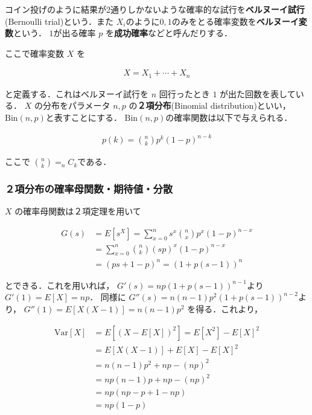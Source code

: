 \documentclass[12pt,a4j,draft]{jarticle}
\numberwithin{equation}{section}
\theoremstyle{break}
\newcommand{\V}{\text{Var}}
\newcommand{\Bin}{\text{Bin}}
\begin{document}
コイン投げのように結果が2通りしかないような確率的な試行を\textbf{ベルヌーイ試行}(Bernoulli trial)という．また $X_i$のように$0,1$のみをとる確率変数を\textbf{ベルヌーイ変数}という． $1$が出る確率 $p$ を\textbf{成功確率}などと呼んだりする．

ここで確率変数 $X$ を

\begin{align}
    X = X_1 + \cdots + X_n
\end{align}

と定義する．これはベルヌーイ試行を $n$ 回行ったとき $1$ が出た回数を表している． $X$ の分布をパラメータ $n,p$ の\textbf{２項分布}(Binomial distribution)といい， $\Bin(n,p)$と表すことにする． $\Bin(n,p)$の確率関数は以下で与えられる．

\begin{align}
    \label{eq:def-pdf-of-bin}
    p(k) = \binom{n}{k} p^k (1-p)^{n-k}
\end{align}

ここで $\displaystyle \binom{n}{k} = _nC_k$である． 

\subsubsection{２項分布の確率母関数・期待値・分散}

$X$ の確率母関数は２項定理を用いて

\begin{align}
    \label{eq:pgf-of-bin}
    G(s) &= E[s^X] = \sum_{x=0}^{n} s^x \binom{n}{x} p^x (1-p)^{n-x} \\
    &= \sum_{x=0}^{n} \binom{n}{k} (sp)^x (1-p)^{n-x} \\
    &= (ps + 1 - p)^n = (1 + p(s-1))^n
\end{align}

とできる．これを用いれば， $G'(s) = np(1 + p(s-1))^{n-1}$より $G'(1) = E[X] = np$． 同様に $G''(s) = n(n-1)p^2(1 + p(s-1))^{n-2}$より， $G''(1) = E[X(X-1)] = n(n-1)p^2$ を得る．これより，

\begin{align}
    \V [X] &= E[(X - E[X])^2] = E[X^2] - E[X]^2 \\
    &= E[X(X-1)] + E[X] - E[X]^2 \\
    &= n(n-1)p^2 + np - (np)^2 \\
    &= np(n-1)p + np - (np)^2 \\
    &= np(np - p + 1 - np) \\
    &= np(1 - p)
\end{align}
\end{document}
